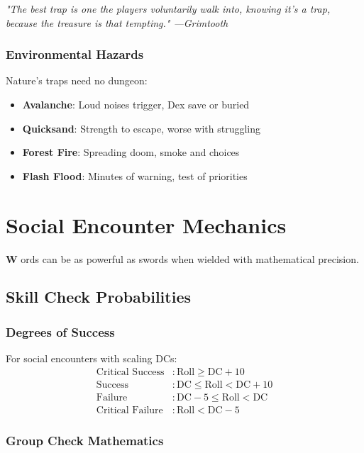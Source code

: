 \documentclass[11pt,letterpaper,openany]{book}
\newcommand{\firstletter}[1]{%
    \textcolor{bloodred}{\fontsize{48}{48}\selectfont\bfseries #1}%
}
\newcommand{\fantasyquote}[1]{%
\begin{center}
\textit{\large #1}
\end{center}
}
\begin{document}
\fantasyquote{"The best trap is one the players voluntarily walk into, knowing it's a trap, because the treasure is that tempting." —Grimtooth}

\subsection{Environmental Hazards}

Nature's traps need no dungeon:
\begin{itemize}
    \item \textbf{Avalanche}: Loud noises trigger, Dex save or buried
    \item \textbf{Quicksand}: Strength to escape, worse with struggling
    \item \textbf{Forest Fire}: Spreading doom, smoke and choices
    \item \textbf{Flash Flood}: Minutes of warning, test of priorities
\end{itemize}

\chapter{Social Encounter Mechanics}

\firstletter{W}ords can be as powerful as swords when wielded with mathematical precision.

\section{Skill Check Probabilities}

\subsection{Degrees of Success}

For social encounters with scaling DCs:
\begin{align}
\text{Critical Success} &: \text{Roll} \geq \text{DC} + 10 \\
\text{Success} &: \text{DC} \leq \text{Roll} < \text{DC} + 10 \\
\text{Failure} &: \text{DC} - 5 \leq \text{Roll} < \text{DC} \\
\text{Critical Failure} &: \text{Roll} < \text{DC} - 5
\end{align}

\subsection{Group Check Mathematics}
\end{document}

